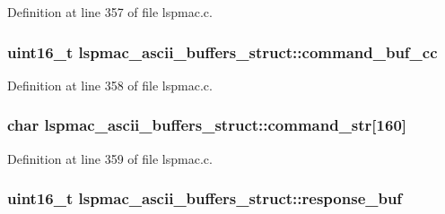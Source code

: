 Definition at line 357 of file lspmac.\-c.

\hypertarget{structlspmac__ascii__buffers__struct_a4d11efeb1eef407d811d3f9b774adc54}{
\subsubsection[{command\-\_\-buf\-\_\-cc}]{\setlength{\rightskip}{0pt plus 5cm}uint16\-\_\-t lspmac\-\_\-ascii\-\_\-buffers\-\_\-struct\-::command\-\_\-buf\-\_\-cc}}\label{structlspmac__ascii__buffers__struct_a4d11efeb1eef407d811d3f9b774adc54}


Definition at line 358 of file lspmac.\-c.

\hypertarget{structlspmac__ascii__buffers__struct_abe6a433dd9be4781dbf7e31d16484a4b}{
\subsubsection[{command\-\_\-str}]{\setlength{\rightskip}{0pt plus 5cm}char lspmac\-\_\-ascii\-\_\-buffers\-\_\-struct\-::command\-\_\-str\mbox{[}160\mbox{]}}}\label{structlspmac__ascii__buffers__struct_abe6a433dd9be4781dbf7e31d16484a4b}


Definition at line 359 of file lspmac.\-c.

\hypertarget{structlspmac__ascii__buffers__struct_ae1d37cf9568478c9d8dad540ce77183c}{
\subsubsection[{response\-\_\-buf}]{\setlength{\rightskip}{0pt plus 5cm}uint16\-\_\-t lspmac\-\_\-ascii\-\_\-buffers\-\_\-struct\-::response\-\_\-buf}}\label{structlspmac__ascii__buffers__struct_ae1d37cf9568478c9d8dad540ce77183c}


